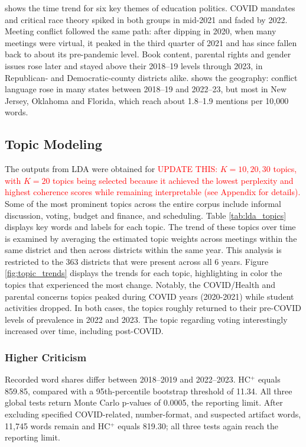 \documentclass[12pt]{article}
\begin{document}
 shows the time trend for six key themes of education
politics. COVID mandates and critical race theory spiked in both groups in mid-2021
and faded by 2022. Meeting conflict followed the same path: after dipping in 2020,
when many meetings were virtual, it peaked in the third quarter of 2021 and has since
fallen back to about its pre-pandemic level. Book content, parental rights and gender
issues rose later and stayed above their 2018--19 levels through 2023, in Republican-
and Democratic-county districts alike.  shows the geography:
conflict language rose in many states between 2018--19 and 2022--23, but most in New
Jersey, Oklahoma and Florida, which reach about 1.8--1.9 mentions per 10,000 words.

\subsection{Topic Modeling}\label{sec:r-comm}
The outputs from LDA were obtained for \textcolor{red}{UPDATE THIS: $K=10,20,30$ topics, with $K=20$ topics being selected because it achieved the lowest perplexity and highest coherence scores while remaining interpretable (see Appendix for details).} Some of the most prominent topics across the entire corpus include informal discussion, voting, budget and finance, and scheduling. Table \ref{tab:lda_topics} displays key words and labels for each topic. The trend of these topics over time is examined by averaging the estimated topic weights across meetings within the same district and then across districts within the same year. This analysis is restricted to the 363 districts that were present across all 6 years. Figure \ref{fig:topic_trends} displays the trends for each topic, highlighting in color the topics that experienced the most change. Notably, the COVID/Health and parental concerns topics peaked during COVID years (2020-2021) while student activities dropped. In both cases, the topics roughly returned to their pre-COVID levels of prevalence in 2022 and 2023. The topic regarding voting interestingly increased over time, including post-COVID.

\subsubsection{Higher Criticism}
Recorded word shares differ between 2018--2019 and 2022--2023.
HC$^{+}$ equals 859.85, compared with a 95th-percentile bootstrap
threshold of 11.34. All three global tests return Monte Carlo
p-values of 0.0005, the reporting limit. After excluding specified
COVID-related, number-format, and suspected artifact words,
11,745 words remain and HC$^{+}$ equals 819.30; all three tests
again reach the reporting limit.
\end{document}
